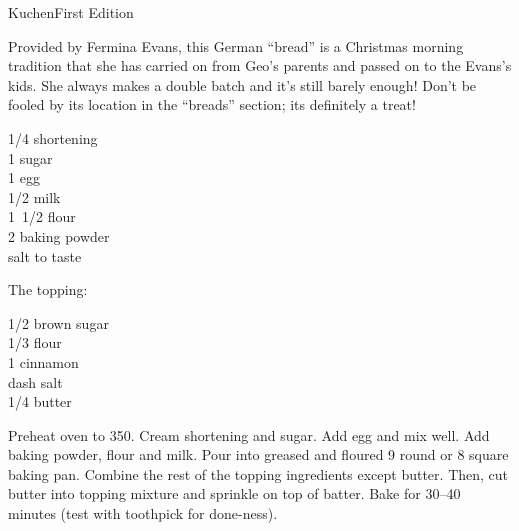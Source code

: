 \begin{entry}{Kuchen}{First Edition}

\begin{open}
  Provided by Fermina Evans, this German ``bread'' is a Christmas morning tradition that she has carried on from Geo's parents and passed on to the Evans's kids. She always makes a double batch and it's still barely enough!
  Don't be fooled by its location in the ``breads'' section; its definitely a
  treat!
\end{open}
\begin{ingredients}
  \SI{1/4}{\cup} shortening\\
  \SI{1}{\cup} sugar \\
  1 egg \\
  \SI{1/2}{\cup} milk \\
  \SI{1/2}[1]{\cup} flour \\
  \SI{2}{\teaspoon} baking powder \\
  salt to taste
\end{ingredients}
The topping:
\begin{ingredients}
  \SI{1/2}{\cup} brown sugar \\
  \SI{1/3}{\cup} flour \\
  \SI{1}{\teaspoon} cinnamon \\
  dash salt\\
  \SI{1/4}{\cup} butter
\end{ingredients}
Preheat oven to \SI{350}{\degreeF}. Cream shortening and sugar. Add egg and mix
well.  Add baking powder, flour and milk. Pour into greased and floured
\SI{9}{\inch} round or \SI{8}{\inch} square baking pan. Combine the rest of
the topping ingredients except butter. Then, cut butter into topping mixture
and sprinkle on top of batter. Bake for \numrange{30}{40} minutes (test with
toothpick for done-ness).
\end{entry}

